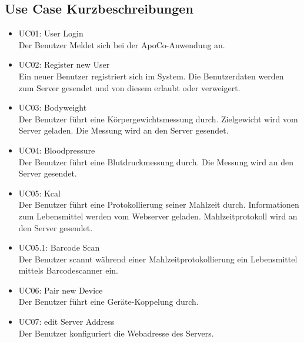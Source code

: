 \subsection{Use Case Kurzbeschreibungen}

\begin{itemize}
 \item UC01: User Login\\ 
 Der Benutzer Meldet sich bei der ApoCo-Anwendung an.
 \item UC02: Register new User\\ 
 Ein neuer Benutzer registriert sich im System.
 Die Benutzerdaten werden zum Server gesendet und von diesem erlaubt oder verweigert.
 \item UC03: Bodyweight\\ 
 Der Benutzer f\"uhrt eine K\"orpergewichtsmessung durch.
 Zielgewicht wird vom Server geladen.
 Die Messung wird an den Server gesendet.
 \item UC04: Bloodpressure\\ 
 Der Benutzer f\"uhrt eine Blutdruckmessung durch.
 Die Messung wird an den Server gesendet.
 \item UC05: Kcal\\ 
 Der Benutzer f\"uhrt eine Protokollierung seiner Mahlzeit durch.
 Informationen zum Lebensmittel werden vom Webserver geladen.
 Mahlzeitprotokoll wird an den Server gesendet.
 \item UC05.1: Barcode Scan\\ 
 Der Benutzer scannt w\"ahrend einer Mahlzeitprotokollierung ein Lebensmittel mittels Barcodescanner ein.
 \item UC06: Pair new Device\\ 
 Der Benutzer f\"uhrt eine Ger\"ate-Koppelung durch.
 \item UC07: edit Server Address\\ 
 Der Benutzer konfiguriert die Webadresse des Servers.
\end{itemize} 
